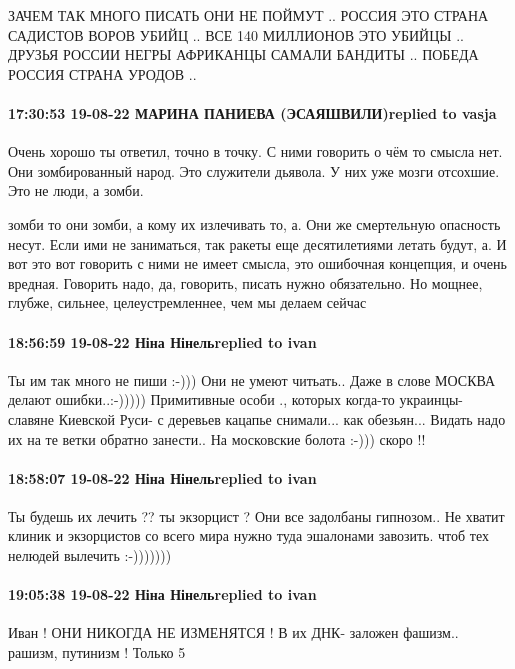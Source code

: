 ЗАЧЕМ ТАК МНОГО ПИСАТЬ ОНИ НЕ ПОЙМУТ .. РОССИЯ ЭТО СТРАНА САДИСТОВ ВОРОВ УБИЙЦ
.. ВСЕ 140 МИЛЛИОНОВ ЭТО УБИЙЦЫ .. ДРУЗЬЯ РОССИИ НЕГРЫ АФРИКАНЦЫ САМАЛИ БАНДИТЫ
.. ПОБЕДА РОССИЯ СТРАНА УРОДОВ ..

\paragraph{17:30:53 19-08-22 МАРИНА ПАНИЕВА (ЭСАЯШВИЛИ)replied to vasja}

Очень хорошо ты ответил, точно в точку. С ними говорить о чём то смысла нет.
Они зомбированный народ. Это служители дьявола. У них уже мозги отсохшие. Это
не люди, а зомби.


зомби то они зомби, а кому их излечивать то, а. Они же смертельную опасность
несут. Если ими не заниматься, так ракеты еще десятилетиями летать будут, а. И
вот это вот говорить с ними не имеет смысла, это ошибочная концепция, и очень
вредная. Говорить надо, да, говорить, писать нужно обязательно. Но мощнее,
глубже, сильнее, целеустремленнее, чем мы делаем сейчас

\paragraph{18:56:59 19-08-22 Ніна Нінельreplied to ivan}

Ты им так много не пиши :-))) Они не умеют читьать.. Даже в слове МОСКВА делают
ошибки..:-))))) Примитивные особи  ., которых когда-то украинцы- славяне
Киевской Руси- с деревьев кацапье снимали... как обезьян... Видать надо их на
те ветки обратно занести.. На московские болота :-))) скоро !!


\paragraph{18:58:07 19-08-22 Ніна Нінельreplied to ivan}

Ты будешь их лечить ?? ты экзорцист ? Они все задолбаны гипнозом.. Не хватит
клиник и экзорцистов со всего мира нужно туда эшалонами завозить. чтоб тех
нелюдей вылечить :-)))))))

\paragraph{19:05:38 19-08-22 Ніна Нінельreplied to ivan}

Иван ! ОНИ НИКОГДА НЕ ИЗМЕНЯТСЯ ! В их ДНК- заложен фашизм.. рашизм, путинизм !
Только 5 %
